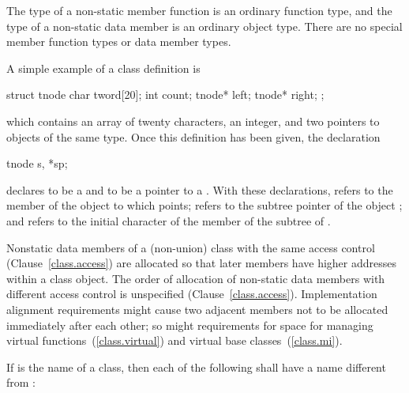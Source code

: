 \pnum
\enternote
The type of a non-static member function is an ordinary function type,
and the type of a non-static data member is an ordinary object type.
There are no special member function types or data member types.
\exitnote

\pnum
{}%
\enterexample
A simple example of a class definition is

\begin{codeblock}
struct tnode {
  char tword[20];
  int count;
  tnode* left;
  tnode* right;
};
\end{codeblock}

which contains an array of twenty characters, an integer, and two
pointers to objects of the same type. Once this definition has been
given, the declaration

\begin{codeblock}
tnode s, *sp;
\end{codeblock}

declares  to be a  and  to be a pointer
to a . With these declarations,  refers to
the  member of the object to which  points;
 refers to the  subtree pointer of the object
; and  refers to the initial character
of the  member of the  subtree of .
\exitexample

\pnum
{}%
Nonstatic data members of a (non-union) class
with the same access control (Clause~\ref{class.access})
are allocated so that later
members have higher addresses within a class object.
%
The order of allocation of non-static data members
with different access control
is unspecified (Clause~\ref{class.access}).
Implementation alignment requirements might cause two adjacent members
not to be allocated immediately after each other; so might requirements
for space for managing virtual functions~(\ref{class.virtual}) and
virtual base classes~(\ref{class.mi}).

\pnum
If  is the name of a class, then each of the following shall
have a name different from :

